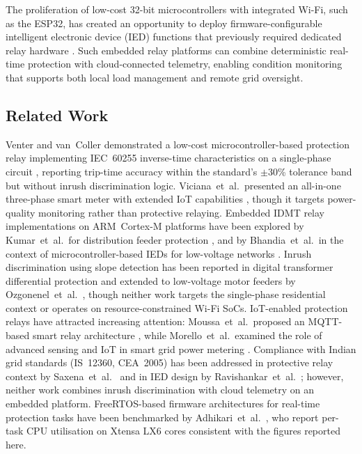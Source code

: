\documentclass[conference]{IEEEtran}
\begin{document}
The proliferation of low-cost 32-bit microcontrollers with integrated
Wi-Fi, such as the ESP32, has created an opportunity to deploy
firmware-configurable intelligent electronic device (IED) functions
that previously required dedicated relay hardware \cite{esp32}.  Such
embedded relay platforms can combine deterministic real-time protection
with cloud-connected telemetry, enabling condition monitoring that
supports both local load management and remote grid oversight.

\subsection{Related Work}

Venter and van~Coller demonstrated a low-cost microcontroller-based
protection relay implementing IEC~60255 inverse-time characteristics on
a single-phase circuit \cite{single_phase_oc_relay}, reporting trip-time
accuracy within the standard's $\pm$30\% tolerance band but without
inrush discrimination logic.  Viciana~et~al.\ presented an all-in-one
three-phase smart meter with extended IoT capabilities
\cite{iot_pq_monitor}, though it targets power-quality monitoring rather
than protective relaying.  Embedded IDMT relay implementations on
ARM~Cortex-M platforms have been explored by Kumar~et~al.\ for
distribution feeder protection \cite{kumar_arm_idmt}, and by
Bhandia~et~al.\ in the context of microcontroller-based IEDs for
low-voltage networks \cite{bhandia_mc_ied}.  Inrush discrimination
using slope detection has been reported in digital transformer
differential protection \cite{inrush_slope_diff} and extended to
low-voltage motor feeders by Ozgonenel~et~al.\ \cite{ozgonenel_inrush},
though neither work targets the single-phase residential context or
operates on resource-constrained Wi-Fi SoCs.  IoT-enabled protection
relays have attracted increasing attention: Moussa~et~al.\ proposed an
MQTT-based smart relay architecture \cite{moussa_iot_relay}, while
Morello~et~al.\ examined the role of advanced sensing and IoT in
smart grid power metering \cite{morello_smart_meter}.  Compliance with
Indian grid standards (IS~12360, CEA~2005) has been addressed in
protective relay context by Saxena~et~al.\ \cite{saxena_india_pq} and
in IED design by Ravishankar~et~al.\ \cite{ravishankar_india_ied};
however, neither work combines inrush discrimination with cloud
telemetry on an embedded platform.  FreeRTOS-based firmware
architectures for real-time protection tasks have been benchmarked by
Adhikari~et~al.\ \cite{adhikari_freertos_relay}, who report per-task
CPU utilisation on Xtensa LX6 cores consistent with the figures
reported here.
\end{document}
